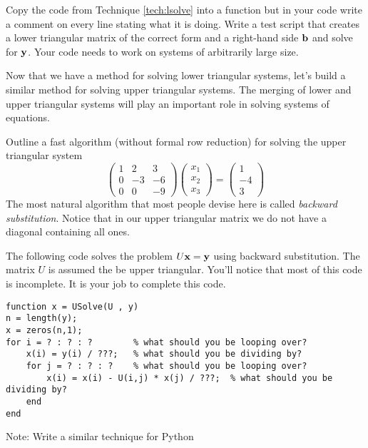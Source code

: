 \begin{problem}
    Copy the code from Technique \ref{tech:lsolve} into a \ProgLang function but in your code
    write a comment on every line stating what it is doing.  Write a test script that
    creates a lower triangular matrix of the correct form and a right-hand side ${\bf b}$ and
    solve for ${\bf y}$.  Your code needs to work on systems of arbitrarily large size.
\end{problem}

Now that we have a method for solving lower triangular systems, let's build a similar
method for solving upper triangular systems.  The merging of lower and upper triangular
systems will play an important role in solving systems of equations.
\begin{problem}
    Outline a fast algorithm (without formal row reduction) for solving the upper triangular system
    \[ \begin{pmatrix} 1 & 2 & 3 \\ 0 & -3 & -6 \\ 0 & 0 & -9 \end{pmatrix}
        \begin{pmatrix} x_1 \\ x_2 \\ x_3 \end{pmatrix} = \begin{pmatrix} 1 \\ -4 \\
        3\end{pmatrix} \]
    The most natural algorithm that most people devise here is called {\it backward
    substitution}.  Notice that in our upper triangular matrix we do not have a diagonal
    containing all ones. 
\end{problem}

\begin{technique}\label{tech:usolve}
    The following code solves the problem $U {\bf x} = {\bf y}$ using backward
    substitution.  The matrix $U$ is assumed the be upper triangular.  You'll notice that
    most of this code is incomplete.  It is your job to complete this code.
\begin{lstlisting}
function x = USolve(U , y)
n = length(y);
x = zeros(n,1);
for i = ? : ? : ?        % what should you be looping over?
    x(i) = y(i) / ???;   % what should you be dividing by?
    for j = ? : ? : ?    % what should you be looping over? 
        x(i) = x(i) - U(i,j) * x(j) / ???;  % what should you be dividing by?
    end
end
\end{lstlisting}
\ifnum{} {\color{red} Note: Write a similar technique for Python}\fi
\end{technique}

